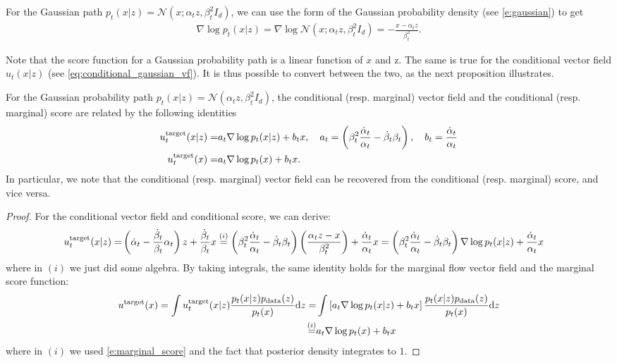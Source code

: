\begin{examplebox} 
For the Gaussian path $p_t(x|z)=\mathcal{N}(x;\alpha_t z,\beta_t^2 I_d)$, we can use the form of the Gaussian probability density (see \cref{e:gaussian}) to get
\begin{align}
\label{eq:cond_score_gaussian}
    \nabla \log p_t(x|z) = \nabla\log \mathcal{N}(x;\alpha_t z,\beta_t^2 I_d) = -\frac{x-\alpha_t z}{\beta_t^2}.
\end{align}
\end{examplebox}

Note that the score function for a Gaussian probability path is a linear function of $x$ and z. The same is true for the conditional vector field $u_t(x|z)$ (see \cref{eq:conditional_gaussian_vf}). It is thus possible to convert between the two, as the next proposition illustrates.
\begin{proposition}
\label{prop:conversion_formula_gaussian_prob_path}
For the Gaussian probability path $p_t(x|z)=\mathcal{N}(\alpha_t z,\beta_t^2 I_d)$, the conditional (resp. marginal) vector field and the conditional (resp. marginal) score are related by the following identities
\begin{align}
u^{\text{target}}_t(x|z)=&a_t\nabla\log p_t(x|z)+b_tx,\quad a_t=\left(\beta_t^2\frac{\dot{\alpha}_t}{\alpha_t}-\dot{\beta}_t\beta_t\right),\quad b_t=\frac{\dot{\alpha}_t}{\alpha_t} \label{eq:reparam_cond}\\
u^{\text{target}}_t(x)=&a_t\nabla\log p_t(x)+b_tx. \label{eq:reparam_uncond}
\end{align}
In particular, we note that the conditional (resp. marginal) vector field can be recovered from the conditional (resp. marginal) score, and vice versa.
\end{proposition}
\begin{proof}
For the conditional vector field and conditional score, we can derive:
\begin{align*}
u^{\text{target}}_t(x|z)=&\left(\dot{\alpha}_t-\frac{\dot{\beta}_t}{\beta_t}\alpha_t\right)z+\frac{\dot{\beta}_t}{\beta_t}x
\overset{(i)}{=}\left(\beta_t^2\frac{\dot{\alpha}_t}{\alpha_t}-\dot{\beta}_t\beta_t\right)\left(\frac{\alpha_tz-x}{\beta_t^2}\right)+\frac{\dot{\alpha}_t}{\alpha_t}x=\left(\beta_t^2\frac{\dot{\alpha}_t}{\alpha_t}-\dot{\beta}_t\beta_t\right)\nabla\log p_t(x|z)+\frac{\dot{\alpha}_t}{\alpha_t}x
\end{align*}
where in $(i)$ we just did some algebra. By taking integrals, the same identity holds for the marginal flow vector field and the marginal score function:
\begin{align*}
u^{\text{target}}(x)= \int u^{\text{target}}_t(x|z)\frac{ p_t(x|z)p_{\rm{data}}(z)}{p_t(x)}\mathrm{d} z
=&\int\left[a_t\nabla\log p_t(x|z)+b_tx\right] \frac{ p_t(x|z)p_{\rm{data}}(z)}{p_t(x)}\mathrm{d} z\\
\overset{(i)}{=}&a_t\nabla\log p_t(x)+b_tx
\end{align*}
where in $(i)$ we used \cref{e:marginal_score} and the fact that posterior density integrates to $1$.
\end{proof}
